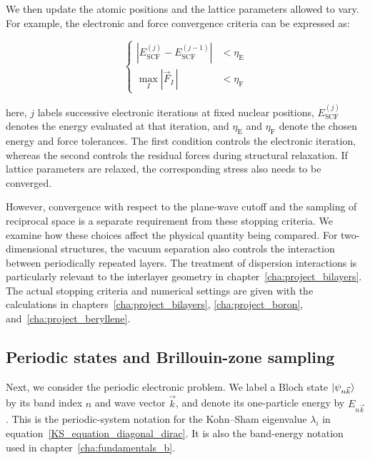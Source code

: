 We then update the atomic positions and the lattice parameters allowed to vary.
For example, the electronic and force convergence criteria can be expressed as:

\begin{equation}
\left\{\begin{aligned}
    \left|E_\mathrm{SCF}^{(j)}-E_\mathrm{SCF}^{(j-1)}\right|
    &<\eta_\mathrm{E} \\
    \max_I|\vec{F}_I\,|&<\eta_\mathrm{F}
\end{aligned}\right.
\label{electronic_and_force_convergence}
\end{equation}

here, $j$ labels successive electronic iterations at fixed nuclear positions,
$E_\mathrm{SCF}^{(j)}$ denotes the energy evaluated at that iteration,
and $\eta_\mathrm{E}$ and $\eta_\mathrm{F}$ denote the chosen energy and force tolerances.
The first condition controls the electronic iteration,
whereas the second controls the residual forces during structural relaxation.
If lattice parameters are relaxed, the corresponding stress also needs to be converged.

However, convergence with respect to the plane-wave cutoff and the sampling of reciprocal space is a separate requirement from these stopping criteria.
We examine how these choices affect the physical quantity being compared.
For two-dimensional structures, the vacuum separation also controls the interaction between periodically repeated layers.
The treatment of dispersion interactions is particularly relevant to the interlayer geometry in chapter~\ref{cha:project_bilayers}.
The actual stopping criteria and numerical settings are given with the calculations in chapters~\ref{cha:project_bilayers}, \ref{cha:project_boron}, and~\ref{cha:project_beryllene}.

\subsection{Periodic states and Brillouin-zone sampling}
\label{subsec:method_kpoints}

Next, we consider the periodic electronic problem.
We label a Bloch state $\ket{\psi_{n\vec{k}}}$ by its band index $n$ and wave vector $\vec{k}$,
and denote its one-particle energy by $E_{n\vec{k}}$.
This is the periodic-system notation for the Kohn--Sham eigenvalue $\lambda_i$ in equation~\eqref{KS_equation_diagonal_dirac}.
It is also the band-energy notation used in chapter~\ref{cha:fundamentals_b}.

